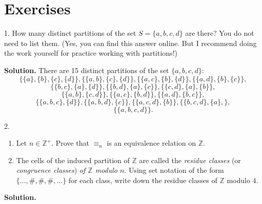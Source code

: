 \documentclass[10pt,]{book}
\theoremstyle{plain}
\theoremstyle{definition}
\theoremstyle{definition}
\theoremstyle{definition}
\theoremstyle{definition}
\numberwithin{equation}{section}
\def\Z{\mathbb{Z}}
\begin{document}
\section[{Exercises}]{Exercises}\label{exercises-8}
\begin{exerciselist}
\item[1.]\hypertarget{exercise-50}{}How many distinct partitions of the set \(S=\{a,b,c,d\}\) are there? You do not need to list them. (Yes, you can find this answer online. But I recommend doing the work yourself for practice working with partitions!)%
\par\smallskip
\par\smallskip
\noindent\textbf{Solution.}\hypertarget{solution-50}{}\quad
There are 15 distinct partitions of the set \(\{a,b,c,d\}\):%
\begin{equation*}
\{\{a\},\{b\},\{c\},\{d\}\}, \{\{a,b\},\{c\},\{d\}\},\{\{a,c\},\{b\},\{d\}\},\{\{a,d\},\{b\},\{c\}\},
\end{equation*}
%
\begin{equation*}
\{\{b,c\},\{a\},\{d\}\},\{\{b,d\},\{a\},\{c\}\},\{\{c,d\},\{a\},\{b\}\},
\end{equation*}
%
\begin{equation*}
\{\{a,b\},\{c,d\}\},
\{\{a,c\},\{b,d\}\},\{\{a,d\},\{b,c\}\},
\end{equation*}
%
\begin{equation*}
\{\{a,b,c\},\{d\}\},\{\{a,b,d\},\{c\}\},\{\{a,c,d\},\{b\}\},\{\{b,c,d\},\{a\},\},
\end{equation*}
%
%
\begin{equation*}
\{\{a,b,c,d\}\}.
\end{equation*}
\item[2.]\hypertarget{exercise-51}{}\leavevmode%
\begin{enumerate}[label=(\alph*)]
\item\hypertarget{li-419}{}Let  \(n\in \Z^+\). Prove that  \(\equiv_n\) is an equivalence relation on \(\Z\).%
\item\hypertarget{li-420}{}The cells of the induced partition of \(\Z\) are called the \emph{residue classes} (or \emph{congruence classes}) \emph{of \(\Z\) modulo \(n\)}.  Using set notation of the form \(\{\ldots,\#, \#,\#,\ldots\}\) for each class, write down the residue classes of \(\Z\) modulo \(4\).%
\end{enumerate}
\par\smallskip
\par\smallskip
\noindent\textbf{Solution.}\hypertarget{solution-51}{}\quad

\end{exerciselist}
\end{document}
